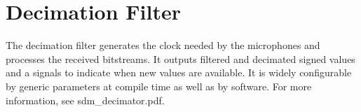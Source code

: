 
\section{Decimation Filter}
\label{sec::filter}

The decimation filter generates the clock needed by the microphones and processes the received bitstreams.
It outputs filtered and decimated signed values and a signals to indicate when new values are available.
It is widely configurable by generic parameters at compile time as well as by software. 
For more information, see sdm\_decimator.pdf.